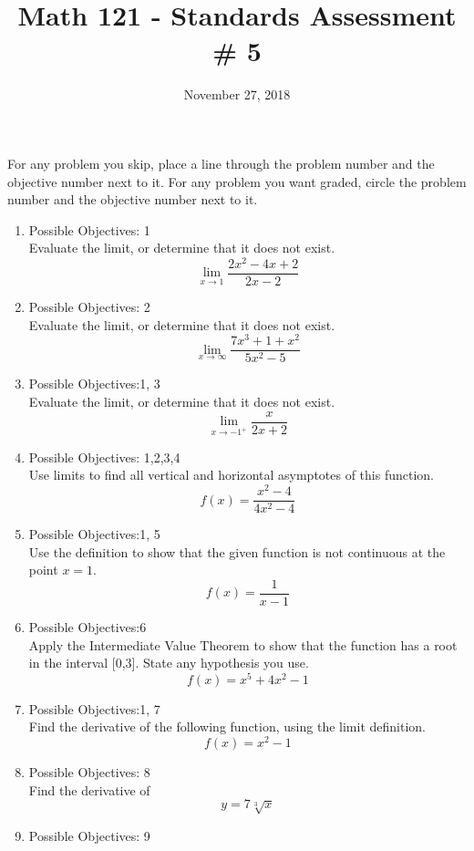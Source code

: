 \documentclass{exam}
\title{Math 121 - Standards Assessment \# 5}
\date{November 27, 2018}
\begin{document}
\maketitle
\bigskip

\begin{center}
\large
    For any problem you skip, place a line through the problem number and the objective number next to it. For any problem you want graded, circle the problem number and the objective number next to it.
\end{center}
\normalsize

\begin{enumerate}
\item Possible Objectives: 1\\
Evaluate the limit, or determine that it does not exist.
$$\lim_{x \rightarrow 1} \frac{2x^2 - 4x + 2}{2x-2}$$
\item Possible Objectives: 2\\
Evaluate the limit, or determine that it does not exist.
$$\lim_{x\rightarrow \infty} \frac{7x^3 + 1 + x^2}{5x^2 -5}$$
\item Possible Objectives:1, 3\\
Evaluate the limit, or determine that it does not exist.
$$\lim_{x \rightarrow -1^+}  \frac{x}{2x+2}$$
\item Possible Objectives: 1,2,3,4\\
Use limits to find all vertical and horizontal asymptotes of this function.
$$f(x) = \frac{x^2 -4}{4x^2 -4}$$
\item Possible Objectives:1, 5\\
Use the definition to show that the given function is not continuous at the point $x = 1$.
$$f(x) = \frac{1}{x-1}$$
\item Possible Objectives:6\\
Apply the Intermediate Value Theorem to show that the function has a root in the interval [0,3]. State any hypothesis you use.
$$f(x) = x^5 + 4x^2 - 1$$
\item Possible Objectives:1, 7\\
Find the derivative of the following function, using the limit definition.
$$f(x) = x^2 -1$$
\item Possible Objectives: 8\\
Find the derivative of $$y = 7\sqrt[3]{x}$$ 
\item Possible Objectives: 9\\

\end{enumerate}
\end{document}
